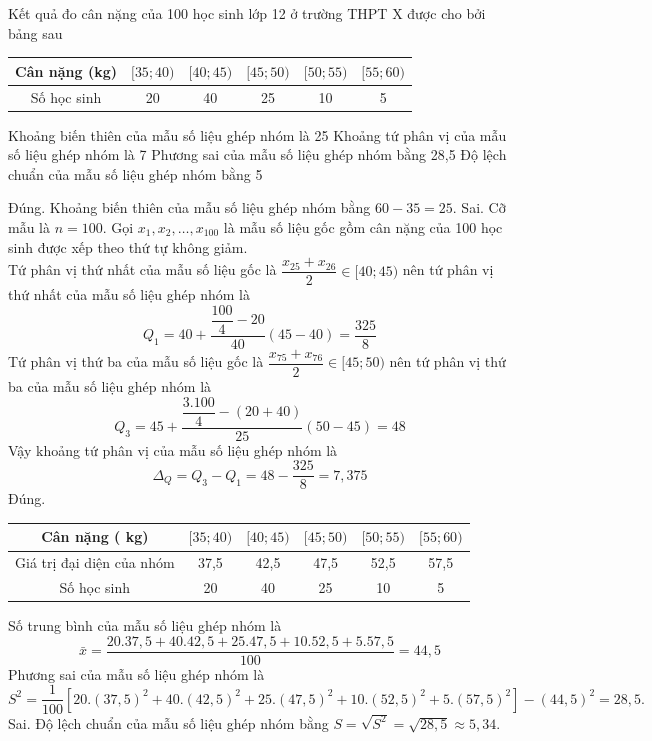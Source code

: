 \begin{ex}%
	Kết quả đo cân nặng của 100 học sinh lớp 12 ở trường THPT X được cho bởi bảng sau
	\begin{center}
		\begin{tabular}{|c|c|c|c|c|c|}
			\hline
			Cân nặng (kg) & {$[35; 40)$} & {$[40; 45)$} & {$[45; 50)$} & {$[50; 55)$} & {$[55; 60)$} \\
			\hline
			Số học sinh & 20 & 40 & 25 & 10 & 5 \\
			\hline
		\end{tabular}
	\end{center}
	\choiceTF
	{\True Khoảng biến thiên của mẫu số liệu ghép nhóm là 25}
	{Khoảng tứ phân vị của mẫu số liệu ghép nhóm là 7}
	{\True Phương sai của mẫu số liệu ghép nhóm bằng 28,5}
	{Độ lệch chuẩn của mẫu số liệu ghép nhóm bằng 5}
	\loigiai
	{
		\begin{itemchoice}
			\itemch Đúng. Khoảng biến thiên của mẫu số liệu ghép nhóm bằng $60-35=25$.
			\itemch Sai. Cỡ mẫu là $n=100$. Gọi $x_1, x_2, \ldots, x_{100}$ là mẫu số liệu gốc gồm cân nặng của 100 học sinh được xếp theo thứ tự không giảm. \\
			Tứ phân vị thứ nhất của mẫu số liệu gốc là $\dfrac{x_{25}+x_{26}}{2} \in[40; 45)$ nên tứ phân vị thứ nhất của mẫu số liệu ghép nhóm là
			$$
			Q_{1}=40+\dfrac{\dfrac{100}{4}-20}{40}(45-40)=\dfrac{325}{8}
			$$
			Tứ phân vị thứ ba của mẫu số liệu gốc là $\dfrac{{x}_{75}+{x}_{76}}{2} \in[45 ; 50)$ nên tứ phân vị thứ ba của mẫu số liệu ghép nhóm là
			$$
			{Q}_{3}=45+\dfrac{\dfrac{3.100}{4}-(20+40)}{25}(50-45)=48
			$$
			Vậy khoảng tứ phân vị của mẫu số liệu ghép nhóm  là $$\Delta_{Q}=Q_{3}-Q_{1}=48-\dfrac{325}{8}=7,375$$
			\itemch Đúng. 
			\begin{center}
				\begin{tabular}{|c|c|c|c|c|c|}
					\hline Cân nặng ( kg) & {$[35 ; 40)$} & {$[40 ; 45)$} & {$[45 ; 50)$} & {$[50 ; 55)$} & {$[55 ; 60)$} \\
					\hline Giá trị đại diện của nhóm & 37,5 & 42,5 & 47,5 & 52,5 & 57,5 \\
					\hline Số học sinh & 20 & 40 & 25 & 10 & 5 \\
					\hline
				\end{tabular}
			\end{center}
			Số trung bình của mẫu số liệu ghép nhóm là
			$$
			\bar{x}=\dfrac{20.37,5+40.42,5+25.47,5+10.52,5+5.57,5}{100}=44,5
			$$
			Phương sai của mẫu số liệu ghép nhóm là
			$$S^{2}=\dfrac{1}{100}\left[20 .(37,5)^{2}+40 .(42,5)^{2}+25 .(47,5)^{2}+10 .(52,5)^{2}+5 .(57,5)^{2}\right]-(44,5)^{2}=28,5.$$
			\itemch Sai. Độ lệch chuẩn của mẫu số liệu ghép nhóm bằng ${S}=\sqrt{{S}^{2}}=\sqrt{28,5} \approx 5,34$.
		\end{itemchoice}
	}
\end{ex}

